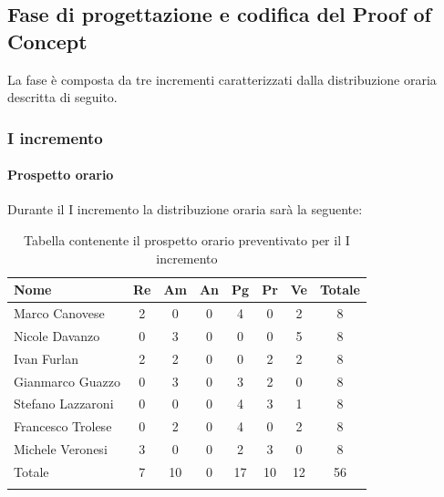 \subsection{Fase di progettazione e codifica del Proof of Concept}
La fase è composta da tre incrementi caratterizzati dalla distribuzione oraria descritta di seguito.

\subsubsection{I incremento}
\paragraph{Prospetto orario}
Durante il I incremento la distribuzione oraria sarà la seguente:

\begin{longtable}{|l|c|c|c|c|c|c|c|}
	\hline
	\rowcolor{lighter-grayer}
	\textbf{Nome}     & \textbf{Re} & \textbf{Am} & \textbf{An} & \textbf{Pg} & \textbf{Pr} & \textbf{Ve} & \textbf{Totale} \\
	\hline
	\endfirsthead

	\hline
	Marco Canovese    & 2           & 0           & 0           & 4           & 0           & 2           & 8               \\
	\hline
	\hline
	Nicole Davanzo    & 0           & 3           & 0           & 0           & 0           & 5           & 8               \\
	\hline
	\hline
	Ivan Furlan       & 2           & 2           & 0           & 0           & 2           & 2           & 8               \\
	\hline
	\hline
	Gianmarco Guazzo  & 0           & 3           & 0           & 3           & 2           & 0           & 8               \\
	\hline
	\hline
	Stefano Lazzaroni & 0           & 0           & 0           & 4           & 3           & 1           & 8               \\
	\hline
	\hline
	Francesco Trolese & 0           & 2           & 0           & 4           & 0           & 2           & 8               \\
	\hline
	\hline
	Michele Veronesi  & 3           & 0           & 0           & 2           & 3           & 0           & 8               \\
	\hline
	\hline
	Totale            & 7           & 10          & 0          & 17           & 10           & 12           & 56              \\
	\hline
	\rowcolor{white}
	\caption{Tabella contenente il prospetto orario preventivato per il I incremento}
\end{longtable}



